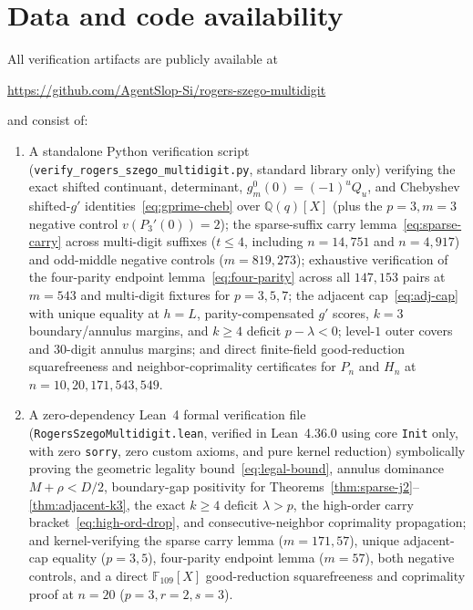 \documentclass[11pt,reqno]{amsart}
\numberwithin{equation}{section}
\theoremstyle{definition}
\theoremstyle{remark}
\newcommand{\F}{\mathbb{F}}
\newcommand{\Q}{\mathbb{Q}}
\begin{document}
\section*{Data and code availability}
All verification artifacts are publicly available at
\begin{center}
\url{https://github.com/AgentSlop-Si/rogers-szego-multidigit}
\end{center}
and consist of:
\begin{enumerate}[label=(\arabic*),leftmargin=2em]
\item A standalone Python verification script (\texttt{verify\_rogers\_szego\_multidigit.py}, standard library only) verifying the exact shifted continuant, determinant, $g_m^0(0)=(-1)^u Q_u$, and Chebyshev shifted-$g'$ identities~\eqref{eq:gprime-cheb} over $\Q(q)[X]$ (plus the $p=3,m=3$ negative control $v(P_3'(0))=2$); the sparse-suffix carry lemma~\eqref{eq:sparse-carry} across multi-digit suffixes ($t\le 4$, including $n=14{,}751$ and $n=4{,}917$) and odd-middle negative controls ($m=819,273$); exhaustive verification of the four-parity endpoint lemma~\eqref{eq:four-parity} across all $147{,}153$ pairs at $m=543$ and multi-digit fixtures for $p=3,5,7$; the adjacent cap~\eqref{eq:adj-cap} with unique equality at $h=L$, parity-compensated $g'$ scores, $k=3$ boundary/annulus margins, and $k\ge 4$ deficit $p-\lambda<0$; level-$1$ outer covers and $30$-digit annulus margins; and direct finite-field good-reduction squarefreeness and neighbor-coprimality certificates for $P_n$ and $H_n$ at $n=10,20,171,543,549$.
\item A zero-dependency Lean~4 formal verification file (\texttt{RogersSzegoMultidigit.lean}, verified in Lean~4.36.0 using core \texttt{Init} only, with zero \texttt{sorry}, zero custom axioms, and pure kernel reduction) symbolically proving the geometric legality bound~\eqref{eq:legal-bound}, annulus dominance $M+\rho<D/2$, boundary-gap positivity for Theorems~\ref{thm:sparse-j2}--\ref{thm:adjacent-k3}, the exact $k\ge 4$ deficit $\lambda > p$, the high-order carry bracket~\eqref{eq:high-ord-drop}, and consecutive-neighbor coprimality propagation; and kernel-verifying the sparse carry lemma ($m=171,57$), unique adjacent-cap equality ($p=3,5$), four-parity endpoint lemma ($m=57$), both negative controls, and a direct $\F_{109}[X]$ good-reduction squarefreeness and coprimality proof at $n=20$ ($p=3,r=2,s=3$).
\end{enumerate}



\end{document}
